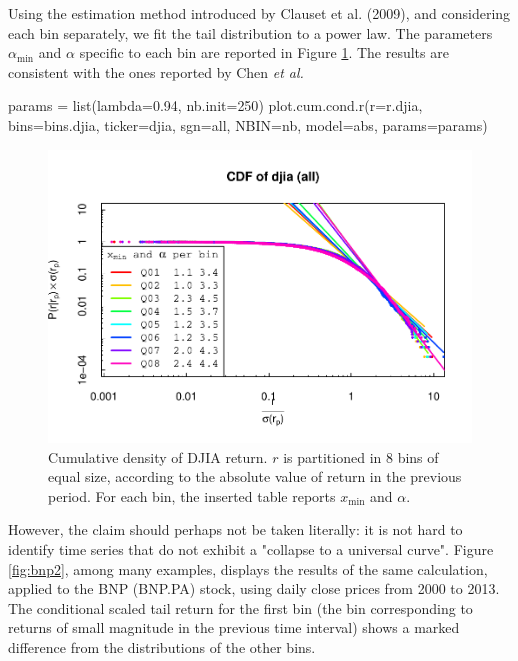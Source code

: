 \documentclass[
  11pt,
]{article}
\newenvironment{Shaded}{\begin{snugshade}}{\end{snugshade}}
\newcommand{\AttributeTok}[1]{\textcolor[rgb]{0.77,0.63,0.00}{#1}}
\newcommand{\DecValTok}[1]{\textcolor[rgb]{0.00,0.00,0.81}{#1}}
\newcommand{\FloatTok}[1]{\textcolor[rgb]{0.00,0.00,0.81}{#1}}
\newcommand{\FunctionTok}[1]{\textcolor[rgb]{0.00,0.00,0.00}{#1}}
\newcommand{\NormalTok}[1]{#1}
\newcommand{\OtherTok}[1]{\textcolor[rgb]{0.56,0.35,0.01}{#1}}
\newcommand{\StringTok}[1]{\textcolor[rgb]{0.31,0.60,0.02}{#1}}
\begin{document}
Using the estimation
method introduced by Clauset et al. (2009), and considering each bin separately,
we fit the tail distribution to a power law. The parameters
\(\alpha_{\text{min}}\) and \(\alpha\) specific to each bin are reported in
Figure \ref{fig:powerlawplot}.
The results are consistent with the ones reported by Chen \emph{et al.}

\begin{Shaded}
\begin{Highlighting}[]
\NormalTok{params }\OtherTok{=} \FunctionTok{list}\NormalTok{(}\AttributeTok{lambda=}\FloatTok{0.94}\NormalTok{, }\AttributeTok{nb.init=}\DecValTok{250}\NormalTok{)}
\FunctionTok{plot.cum.cond.r}\NormalTok{(}\AttributeTok{r=}\NormalTok{r.djia, }\AttributeTok{bins=}\NormalTok{bins.djia, }\AttributeTok{ticker=}\StringTok{\textquotesingle{}djia\textquotesingle{}}\NormalTok{, }\AttributeTok{sgn=}\StringTok{\textquotesingle{}all\textquotesingle{}}\NormalTok{,}
\AttributeTok{NBIN=}\NormalTok{nb, }\AttributeTok{model=}\StringTok{\textquotesingle{}abs\textquotesingle{}}\NormalTok{, }\AttributeTok{params=}\NormalTok{params)}
\end{Highlighting}
\end{Shaded}

\begin{figure}[H]
\includegraphics[width=0.7\linewidth,height=0.7\textheight]{figs/powerlawplot-1} \caption{Cumulative density of DJIA return. $r$ is partitioned in 8 bins of equal size, according to the absolute value of return in the previous period. For each bin, the inserted table reports $x_{\text{min}}$ and $\alpha$.}\label{fig:powerlawplot}
\end{figure}

However, the claim should perhaps not be taken literally: it is not
hard to identify time series that do not exhibit a "collapse to a
universal curve". Figure \ref{fig:bnp2}, among many examples, displays the results of the
same calculation, applied to the BNP (BNP.PA) stock, using daily close
prices from 2000 to 2013. The conditional scaled tail return for the
first bin (the bin corresponding to returns of small magnitude in the
previous time interval) shows a marked difference from the distributions
of the other bins.
\end{document}
